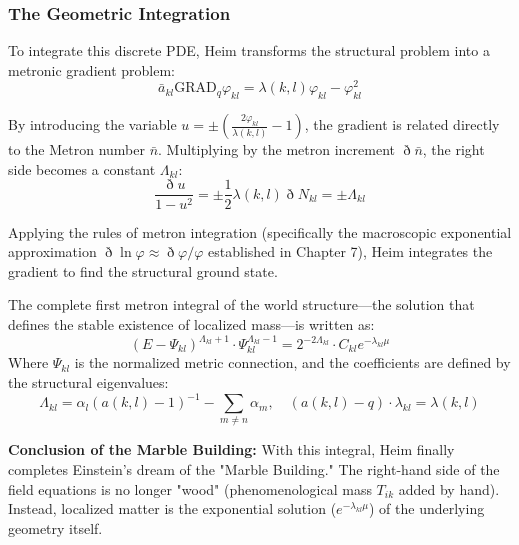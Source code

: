 \documentclass[11pt,a4paper,oneside]{article}
\newcommand{\ethop}{\eth}
\begin{document}
\subsubsection{The Geometric Integration}

To integrate this discrete PDE, Heim transforms the structural problem into a metronic gradient problem:
\begin{equation}
    \bar{a}_{kl} \mathrm{GRAD}_q \varphi_{kl} = \lambda(k,l)\varphi_{kl} - \varphi_{kl}^2
\end{equation}

By introducing the variable $u = \pm (\frac{2\varphi_{kl}}{\lambda(k, l)} - 1)$, the gradient is related directly to the Metron number $\bar{n}$. Multiplying by the metron increment $\ethop \bar{n}$, the right side becomes a constant $\Lambda_{kl}$:
\begin{equation}
    \frac{\ethop u}{1 - u^2} = \pm \frac{1}{2} \lambda(k, l) \ethop N_{kl} = \pm \Lambda_{kl}
\end{equation}

Applying the rules of metron integration (specifically the macroscopic exponential approximation $\ethop \ln \varphi \approx \ethop \varphi / \varphi$ established in Chapter 7), Heim integrates the gradient to find the structural ground state.

\begin{tcolorbox}[colback=white, colframe=theoryblue, title=\textbf{The Fundamental Structural Integral}]
The complete first metron integral of the world structure—the solution that defines the stable existence of localized mass—is written as:
\begin{equation}
    (E - \Psi_{kl})^{\Lambda_{kl} + 1} \cdot \Psi_{kl}^{\Lambda_{kl} - 1} = 2^{-2\Lambda_{kl}} \cdot C_{kl} e^{-\lambda_{kl} \mu}
\end{equation}
Where $\Psi_{kl}$ is the normalized metric connection, and the coefficients are defined by the structural eigenvalues:
\begin{equation}
    \Lambda_{kl} = \alpha_l (a(k, l) - 1)^{-1} - \sum_{m \neq n} \alpha_m, \quad (a(k, l) - q) \cdot \lambda_{kl} = \lambda(k, l)
\end{equation}
\end{tcolorbox}

\textbf{Conclusion of the Marble Building:} 
With this integral, Heim finally completes Einstein's dream of the "Marble Building." The right-hand side of the field equations is no longer "wood" (phenomenological mass $T_{ik}$ added by hand). Instead, localized matter is the exponential solution ($e^{-\lambda_{kl} \mu}$) of the underlying geometry itself. 
\end{document}
